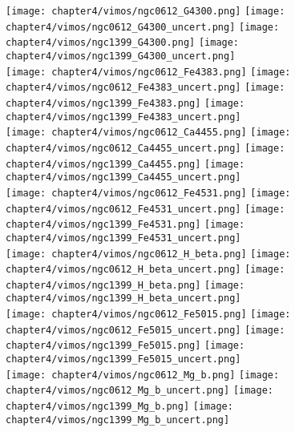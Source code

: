 \begin{figure*}
	\centering
	\texttt{[image: chapter4/vimos/ngc0612\_G4300.png]}
	\texttt{[image: chapter4/vimos/ngc0612\_G4300\_uncert.png]}
	\texttt{[image: chapter4/vimos/ngc1399\_G4300.png]}
	\texttt{[image: chapter4/vimos/ngc1399\_G4300\_uncert.png]}
	\\
	\texttt{[image: chapter4/vimos/ngc0612\_Fe4383.png]}
	\texttt{[image: chapter4/vimos/ngc0612\_Fe4383\_uncert.png]}
	\texttt{[image: chapter4/vimos/ngc1399\_Fe4383.png]}
	\texttt{[image: chapter4/vimos/ngc1399\_Fe4383\_uncert.png]}
	\\
	\texttt{[image: chapter4/vimos/ngc0612\_Ca4455.png]}
	\texttt{[image: chapter4/vimos/ngc0612\_Ca4455\_uncert.png]}
	\texttt{[image: chapter4/vimos/ngc1399\_Ca4455.png]}
	\texttt{[image: chapter4/vimos/ngc1399\_Ca4455\_uncert.png]}
	\\
	\texttt{[image: chapter4/vimos/ngc0612\_Fe4531.png]}
	\texttt{[image: chapter4/vimos/ngc0612\_Fe4531\_uncert.png]}
	\texttt{[image: chapter4/vimos/ngc1399\_Fe4531.png]}
	\texttt{[image: chapter4/vimos/ngc1399\_Fe4531\_uncert.png]}
	\\
	\texttt{[image: chapter4/vimos/ngc0612\_H\_beta.png]}
	\texttt{[image: chapter4/vimos/ngc0612\_H\_beta\_uncert.png]}
	\texttt{[image: chapter4/vimos/ngc1399\_H\_beta.png]}
	\texttt{[image: chapter4/vimos/ngc1399\_H\_beta\_uncert.png]}
	\\
	\texttt{[image: chapter4/vimos/ngc0612\_Fe5015.png]}
	\texttt{[image: chapter4/vimos/ngc0612\_Fe5015\_uncert.png]}
	\texttt{[image: chapter4/vimos/ngc1399\_Fe5015.png]}
	\texttt{[image: chapter4/vimos/ngc1399\_Fe5015\_uncert.png]}
	\\
	\texttt{[image: chapter4/vimos/ngc0612\_Mg\_b.png]}
	\texttt{[image: chapter4/vimos/ngc0612\_Mg\_b\_uncert.png]}
	\texttt{[image: chapter4/vimos/ngc1399\_Mg\_b.png]}
	\texttt{[image: chapter4/vimos/ngc1399\_Mg\_b\_uncert.png]}
	\\
\end{figure*}


